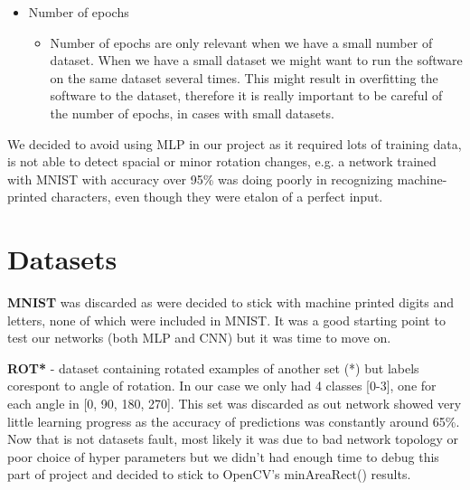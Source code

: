 \documentclass[Report.tex]{subfiles}
\begin{document}
\begin{flushleft}
\begin{itemize}
\begin{itemize}
   \end{itemize}
   \item{Number of epochs}
   \begin{itemize}
    \item{Number of epochs are only relevant when we have a small number of dataset. When we have a small dataset we might want to run the software on the same dataset several times. This might result in overfitting the software to the dataset, therefore it is really important to be careful of the number of epochs, in cases with small datasets.}
   \end{itemize}
  \end{itemize}
\end{flushleft}

\begin{flushleft}
We decided to avoid using MLP in our project as it required lots of training data, is not able to detect spacial or minor rotation changes, e.g. a network trained with MNIST with accuracy over 95\% was doing poorly in recognizing machine-printed characters, even though they were etalon of a perfect input. 

\end{flushleft}

\section{Datasets}
\begin{flushleft}

\textbf{MNIST} was discarded as were decided to stick with machine printed digits and letters, none of which were included in MNIST. It was a good starting point to test our networks (both MLP and CNN) but it was time to move on.

\par
\textbf{ROT*} - dataset containing rotated examples of another set (*) but labels corespont to angle of rotation. In our case we only had 4 classes [0-3], one for each angle in [0, 90, 180, 270].
This set was discarded as out network showed very little learning progress as the accuracy of predictions was constantly around 65\%. Now that is not datasets fault, most likely it was due to bad network topology or poor choice of hyper parameters but we didn't had enough time to debug this part of project and decided to stick to OpenCV's minAreaRect() results. 


\end{flushleft}
\end{document}
